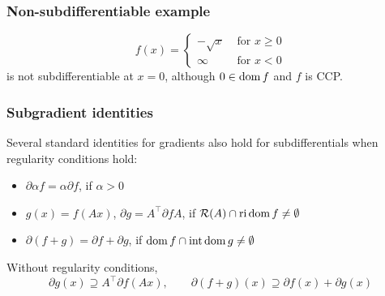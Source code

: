 \documentclass[10pt,mathserif]{beamer}
\begin{document}
\begin{frame}
\frametitle{Non-subdifferentiable example}
\[
f(x)=
\left\{
\begin{array}{ll}
-\sqrt{x}&\text{ for }x \ge 0\\
\infty&\text{ for }x <0
\end{array}
\right.
\]
is not subdifferentiable at $x=0$,
although $0\in \mathrm{dom}\, f$ and $f$ is CCP.

\vspace{0.1in}
\begin{center}
\end{center}
\end{frame}

\begin{frame}
\frametitle{Subgradient identities}

Several standard identities for gradients also hold for subdifferentials when regularity conditions hold:
\begin{itemize}
\item
$\partial \alpha f=\alpha \partial f$, if $\alpha>0$
\item
$g(x)=f(Ax)$, 
$\partial g=A^\intercal\partial f A$, if ${\mathcal{R}}(A)\cap \mathrm{ri}\, \mathrm{dom}\, f\ne\emptyset$
\item
$\partial (f+g)=\partial f+\partial g$, if $\mathrm{dom}\, f\cap \mathrm{int}\,\mathrm{dom}\, g\ne\emptyset$
\end{itemize}

\vspace{0.2in}


Without regularity conditions,
\[
\partial g(x)\supseteq A^\intercal\partial f(Ax),
\qquad
\partial (f+g)(x)\supseteq\partial f(x)+\partial g(x)
\]

\end{frame}
\end{document}
